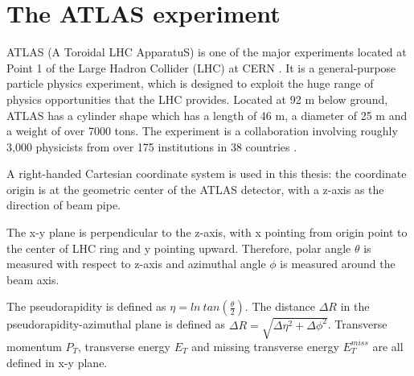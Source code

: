 \chapter{The ATLAS experiment}

\label{ch:atlas}
\par ATLAS (A Toroidal LHC ApparatuS) is one of the major experiments located at Point 1 of the Large Hadron Collider (LHC) at CERN \cite{Aad:2008zzm}. 
It is a general-purpose particle physics experiment, which is designed to exploit the huge range of physics opportunities that the LHC provides. 
		Located at 92 m below ground, ATLAS has a cylinder shape which has a length of 46 m, a diameter of 25 m and a weight of over 7000 tons.
 The experiment is a collaboration involving roughly 3,000 physicists from over 175 institutions in 38 countries \cite{fact}.

A right-handed Cartesian coordinate system is used in this thesis: the coordinate origin is at the geometric center of the ATLAS detector, with a z-axis as 
the direction of beam pipe.
\par The x-y plane is perpendicular to the z-axis, with x pointing from origin point to the center 
of LHC ring and y pointing upward. Therefore, polar angle $\theta$ is measured with respect to z-axis and azimuthal angle $\phi$ is measured around the beam axis. 
\par The pseudorapidity is defined as $\eta = ln~tan(\frac{\theta}{2})$. The distance $\Delta R$ in the pseudorapidity-azimuthal plane is defined as 
$\Delta R = \sqrt{\Delta\eta^2 + \Delta\phi^2}$. Transverse momentum $P_T$, transverse energy $E_T$ and missing transverse energy $E_T^{miss}$ are all defined in x-y plane.				

